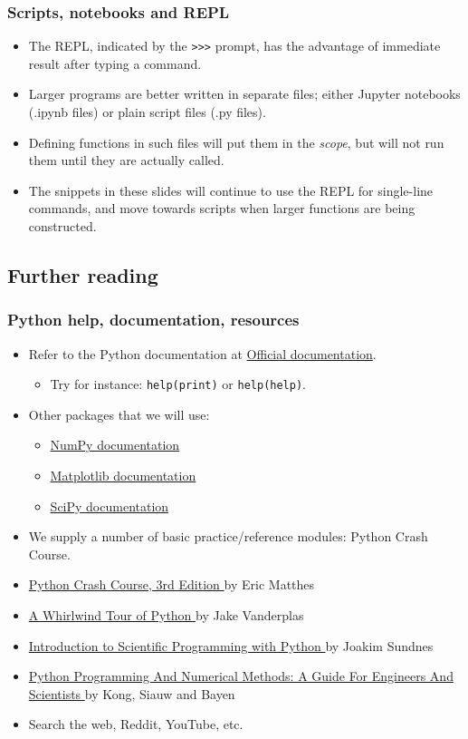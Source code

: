\begin{frame}[fragile]
  \frametitle{Scripts, notebooks and REPL}
  \begin{itemize}
    \item The REPL, indicated by the \lstinline|>>>| prompt, has the advantage of immediate result after typing a command.
    \item Larger programs are better written in separate files; either Jupyter notebooks (.ipynb files) or plain script files (.py files).
    \item Defining functions in such files will put them in the \emph{scope}, but will not run them until they are actually called.
    \item The snippets in these slides will continue to use the REPL for single-line commands, and move towards scripts when larger functions are being constructed.
  \end{itemize}
\end{frame}

\subsection{Further reading}
\begin{frame}[fragile]
\frametitle{Python help, documentation, resources}
\begin{itemize}
  \item Refer to the Python documentation at \href{https://docs.python.org/3/}{Official documentation}.
  \begin{itemize}
    \item Try for instance: \lstinline$help(print)$ or \lstinline$help(help)$.
  \end{itemize}
  \item Other packages that we will use:
  \begin{itemize}
    \item \href{https://numpy.org/doc/stable/}{NumPy documentation}
    \item \href{https://matplotlib.org/stable/}{Matplotlib documentation}
    \item \href{https://docs.scipy.org/}{SciPy documentation}
  \end{itemize}
  \item We supply a number of basic practice/reference modules: Python Crash Course.
  \item \href{https://tue.on.worldcat.org/oclc/1346554335}{Python Crash Course, 3rd Edition \faExternalLink} by Eric Matthes
  \item \href{https://tue.on.worldcat.org/oclc/1023864062}{A Whirlwind Tour of Python \faExternalLink} by Jake Vanderplas
  \item \href{https://tue.on.worldcat.org/oclc/1164494156}{Introduction to Scientific Programming with Python \faExternalLink} by Joakim Sundnes
  \item \href{https://pythonnumericalmethods.berkeley.edu/notebooks/Index.html}{Python Programming And Numerical Methods: A Guide For Engineers And Scientists \faExternalLink} by Kong, Siauw and Bayen
  \item Search the web, Reddit, YouTube, etc.
\end{itemize}
\end{frame}

